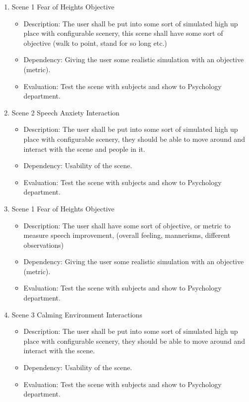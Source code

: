 \documentclass[a4paper,10pt,twoside]{article}
\begin{document}
\begin{enumerate}
		
		\item Scene 1 Fear of Heights Objective 
		\begin{itemize}
		\item Description: The user shall be put into some sort of simulated high up place with configurable scenery, this scene shall have some sort of objective (walk to point, stand for so long etc.)
		\item Dependency: Giving the user some realistic simulation with an objective (metric).
		\item Evaluation: Test the scene with subjects and show to Psychology department. 
		\end{itemize}
		
		\item Scene 2 Speech Anxiety Interaction
		\begin{itemize}
		\item Description: The user shall be put into some sort of simulated high up place with configurable scenery, they should be able to move around and interact with the scene and people in it.
		\item Dependency: Usability of the scene.
		\item Evaluation: Test the scene with subjects and show to Psychology department. 
		\end{itemize}
		\item Scene 1 Fear of Heights Objective 
		\begin{itemize}
		\item Description: The user shall have some sort of objective, or metric to measure speech improvement, (overall feeling, mannerisms, different observations)
		\item Dependency: Giving the user some realistic simulation with an objective (metric).
		\item Evaluation: Test the scene with subjects and show to Psychology department. 
		\end{itemize}
		
		
		\item Scene 3 Calming Environment Interactions
		\begin{itemize}
		\item Description: The user shall be put into some sort of simulated high up place with configurable scenery, they should be able to move around and interact with the scene.
		\item Dependency: Usability of the scene.
		\item Evaluation: Test the scene with subjects and show to Psychology department. 
		\end{itemize}
		

\end{enumerate}
\end{document}
